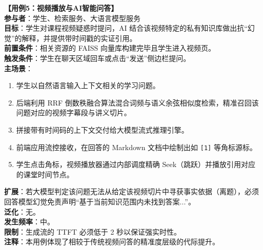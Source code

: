 \vspace{1em}
\noindent\textbf{【用例5：视频播放与AI智能问答】}\\
\textbf{参与者}：学生、检索服务、大语言模型服务\\
\textbf{目标}：学生对课程视频疑惑时提问，AI 结合该视频特定的私有知识库做出抗“幻觉”的解释，并提供带时间戳的实证引用。\\
\textbf{前置条件}：相关资源的 FAISS 向量库构建完毕且学生进入视频页。\\
\textbf{触发条件}：学生在聊天区域回车或点击“发送”侧边栏提问。\\
\textbf{主场景}：
\begin{enumerate}
    \item 学生以自然语言输入上下文相关的学习问题。
    \item 后端利用 RRF 倒数秩融合算法混合词频与语义余弦相似度检索，精准召回该问题对应的视频字幕段与讲义切片。
    \item 拼接带有时间码的上下文交付给大模型流式推理引擎。
    \item 前端应用流控接收，在回答的 Markdown 文档中绘制出如 \texttt{[1]} 等角标源标。
    \item 学生点击角标，视频播放器通过内部调度精确 Seek（跳跃）并播放引用对应的课堂时间节点。
\end{enumerate}
\textbf{扩展}：若大模型判定该问题无法从给定该视频切片中寻获事实依据（离题），必须回答模型幻觉免责声明“基于当前知识范围内未找到答案...”。\\
\textbf{泛化}：无。\\
\textbf{发生频率}：中。\\
\textbf{限制}：生成流的 TTFT 必须低于 2 秒以保证强实时性。\\
\textbf{注释}：本用例体现了相较于传统视频问答的精准度层级的代际提升。

